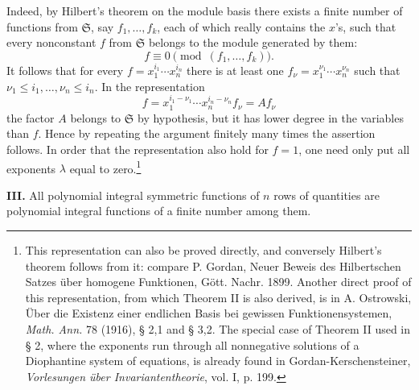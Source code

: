 \documentclass[11pt]{article}
\providecommand{\frS}{\mathfrak S}
\begin{document}
Indeed, by Hilbert's theorem on the module basis there exists a finite number of functions from \(\frS\), say \(f_1,\ldots,f_k\), each of which really contains the \(x\)'s, such that every nonconstant \(f\) from \(\frS\) belongs to the module generated by them:
\[
        f\equiv0\pmod{(f_1,\ldots,f_k)}.
\]
It follows that for every \(f=x_1^{i_1}\cdots x_n^{i_n}\) there is at least one \(f_\nu=x_1^{\nu_1}\cdots x_n^{\nu_n}\) such that \(\nu_1\le i_1,\ldots,\nu_n\le i_n\). In the representation
\[
        f=x_1^{i_1-\nu_1}\cdots x_n^{i_n-\nu_n} f_\nu = A f_\nu
\]
the factor \(A\) belongs to \(\frS\) by hypothesis, but it has lower degree in the variables than \(f\). Hence by repeating the argument finitely many times the assertion follows. In order that the representation also hold for \(f=1\), one need only put all exponents \(\lambda\) equal to zero.\footnote{This representation can also be proved directly, and conversely Hilbert's theorem follows from it: compare P. Gordan, Neuer Beweis des Hilbertschen Satzes über homogene Funktionen, Gött. Nachr. 1899. Another direct proof of this representation, from which Theorem II is also derived, is in A. Ostrowski, Über die Existenz einer endlichen Basis bei gewissen Funktionensystemen, \emph{Math. Ann.} 78 (1916), § 2,1 and § 3,2. The special case of Theorem II used in § 2, where the exponents run through all nonnegative solutions of a Diophantine system of equations, is already found in Gordan-Kerschensteiner, \emph{Vorlesungen über Invariantentheorie}, vol. I, p. 199.}

\textbf{III.} All polynomial integral symmetric functions of \(n\) rows of quantities are polynomial integral functions of a finite number among them.
\end{document}
